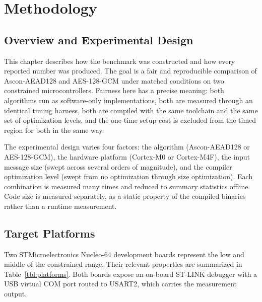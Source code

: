 \chapter{Methodology}

\section{Overview and Experimental Design}

This chapter describes how the benchmark was constructed and how every reported
number was produced.
The goal is a fair and reproducible comparison of Ascon-AEAD128 and AES-128-GCM
under matched conditions on two constrained microcontrollers.
Fairness here has a precise meaning: both algorithms run as software-only
implementations, both are measured through an identical timing harness, both are
compiled with the same toolchain and the same set of optimization levels, and the
one-time setup cost is excluded from the timed region for both in the same way.

The experimental design varies four factors: the algorithm (Ascon-AEAD128 or
AES-128-GCM), the hardware platform (Cortex-M0 or Cortex-M4F), the input
message size (swept across several orders of magnitude), and the compiler
optimization level (swept from no optimization through size optimization).
Each combination is measured many times and reduced to summary statistics
offline.
Code size is measured separately, as a static property of the compiled binaries
rather than a runtime measurement.

\section{Target Platforms}

Two STMicroelectronics Nucleo-64 development boards represent the low and
middle of the constrained range.
Their relevant properties are summarized in Table~\ref{tbl:platforms}.
Both boards expose an on-board ST-LINK debugger with a USB virtual COM port
routed to USART2, which carries the measurement output.

